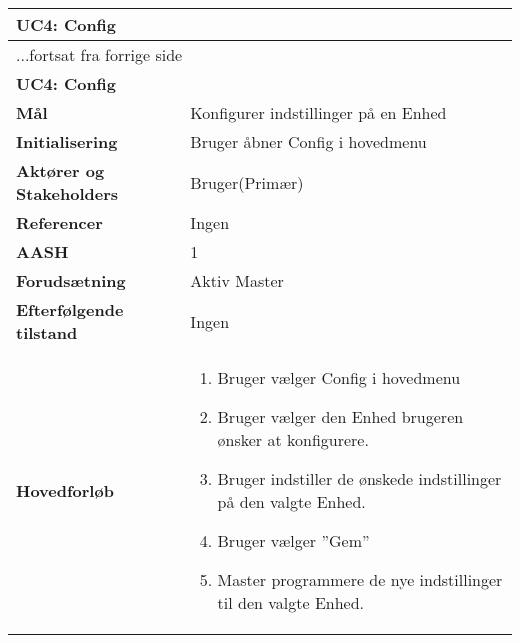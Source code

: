 \begin{center} \centering \label{UC4}
	\begin{longtable}{|p{5cm}|p{9cm}|}  %
	\hline
		\multicolumn{2}{|l|}{\textbf{UC4: Config}} \\\hline %
		\endfirsthead
		
		\multicolumn{2}{l}{...fortsat fra forrige side} \\ \hline %
		\multicolumn{2}{|l|}{\textbf{UC4: Config}} \\\hline %
		\endhead	
		
		\textbf{Mål}								&Konfigurer indstillinger på en Enhed			\\\hline
		\textbf{Initialisering}					&Bruger åbner Config i hovedmenu		\\\hline
		\textbf{Aktører og Stakeholders}			&Bruger(Primær)					\\\hline
		\textbf{Referencer}						&Ingen							\\\hline
		\textbf{AASH}							&1								\\\hline
		\textbf{Forudsætning}					&Aktiv Master					\\\hline
		\textbf{Efterfølgende tilstand}			&Ingen							\\\hline
		\textbf{Hovedforløb}					
			&\begin{enumerate}
	
				\item Bruger vælger Config i hovedmenu
				
				\item Bruger vælger den Enhed brugeren ønsker at konfigurere.
				
				\item Bruger indstiller de ønskede indstillinger på den valgte Enhed.
				
				\item Bruger vælger ''Gem''
				
				\item Master programmere de nye indstillinger til den valgte Enhed. 
	
			\end{enumerate}\\\hline
	\end{longtable}
\end{center}

